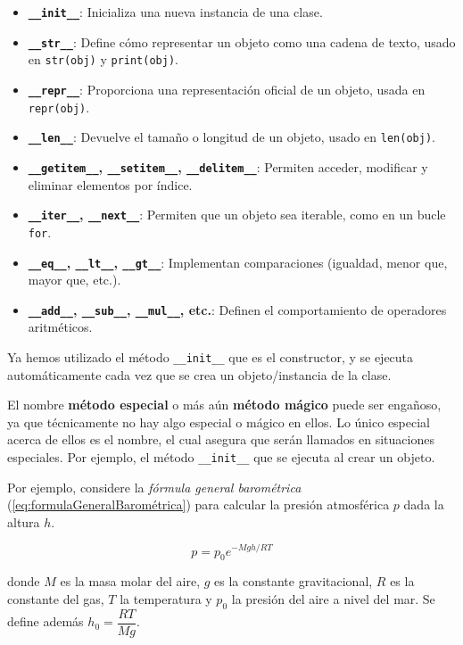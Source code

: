\begin{itemize}
\item
  \textbf{\texttt{\_\_init\_\_}}: Inicializa una nueva instancia de una clase.
\item
  \textbf{\texttt{\_\_str\_\_}}: Define cómo representar un objeto como una cadena de texto, usado en \texttt{str(obj)} y \texttt{print(obj)}.
\item
  \textbf{\texttt{\_\_repr\_\_}}: Proporciona una representación oficial de un objeto, usada en \texttt{repr(obj)}.
\item
  \textbf{\texttt{\_\_len\_\_}}: Devuelve el tamaño o longitud de un objeto, usado en \texttt{len(obj)}.
\item
  \textbf{\texttt{\_\_getitem\_\_}, \texttt{\_\_setitem\_\_}, \texttt{\_\_delitem\_\_}}: Permiten acceder, modificar y eliminar
  elementos por índice.
\item
  \textbf{\texttt{\_\_iter\_\_}, \texttt{\_\_next\_\_}}: Permiten que un objeto sea iterable, como en un bucle \texttt{for}.
\item
  \textbf{\texttt{\_\_eq\_\_}, \texttt{\_\_lt\_\_}, \texttt{\_\_gt\_\_}}: Implementan comparaciones (igualdad, menor que,
  mayor que, etc.).
\item
  \textbf{\texttt{\_\_add\_\_}, \texttt{\_\_sub\_\_}, \texttt{\_\_mul\_\_}, etc.}: Definen el comportamiento de operadores
  aritméticos.
\end{itemize}

Ya hemos utilizado el método \texttt{\_\_init\_\_} que es el
constructor, y se ejecuta automáticamente cada vez que se crea un
objeto/instancia de la clase.

El nombre \textbf{método especial} o más aún \textbf{método mágico}
puede ser engañoso, ya que técnicamente no hay algo especial o mágico en
ellos. Lo único especial acerca de ellos es el nombre, el cual asegura
que serán llamados en situaciones especiales. Por ejemplo, el método
\texttt{\_\_init\_\_} que se ejecuta al crear un objeto.

Por ejemplo, considere la \emph{fórmula general barométrica} (\ref{eq:formulaGeneralBarométrica}) para
calcular la presión atmosférica \(p\) dada la altura \(h\).

\begin{equation}
   p = p_0e^{-Mgh/RT} 
   \label{eq:formulaGeneralBarométrica}
\end{equation}


donde \(M\) es la masa molar del aire, \(g\) es la constante
gravitacional, \(R\) es la constante del gas, \(T\) la temperatura y
\(p_0\) la presión del aire a nivel del mar. Se define además
\(h_0 = \dfrac{RT}{Mg}\).


